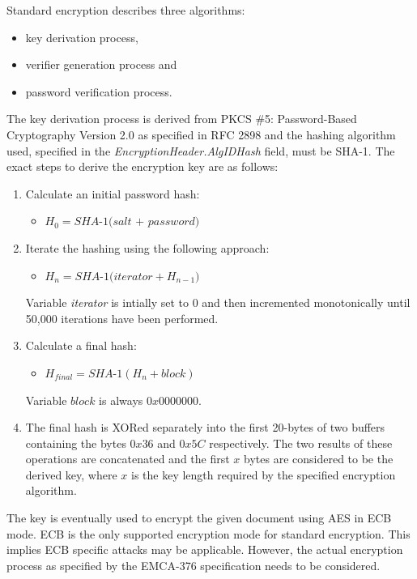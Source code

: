 \documentclass[11pt,oneside]{fithesis2}
\begin{document}
Standard encryption describes three algorithms:
\begin{itemize}
	\setlength\itemsep{0.1em}
	\item{key derivation process,}
	\item{verifier generation process and}
	\item{password verification process.}
\end{itemize}

The key derivation process is derived from PKCS \#5: Password-Based Cryptography Version 2.0 as specified in RFC 2898 \cite{rfc2898} and the hashing algorithm used, specified in the \textit{EncryptionHeader.AlgIDHash} field, must be SHA-1. The exact steps to derive the encryption key are as follows:

\begin{enumerate}
\item{Calculate an initial password hash:}
	\begin{itemize}
		\item{$H_0 =\textit{SHA-1(salt + password)}$}
	\end{itemize}
\item{Iterate the hashing using the following approach: 
	\begin{itemize}
		\item{$H_n = \textit{SHA-1(iterator} + H_{n-1})$}
	\end{itemize}
	Variable \textit{iterator} is intially set to 0 and then incremented monotonically until 50,000 iterations have been performed.}
\item{Calculate a final hash:
	\begin{itemize}
		\item{$H_{final} = \textit{SHA-1}(H_n + block)$}
	\end{itemize}
	Variable $block$ is always $0x0000000$.}
\item{The final hash is XORed separately into the first 20-bytes of two buffers containing the bytes $0x36$ and $0x5C$ respectively. The two results of these operations are concatenated and the first $x$ bytes are considered to be the derived key, where $x$ is the key length required by the specified encryption algorithm.}
\end{enumerate}

The key is eventually used to encrypt the given document using AES in ECB mode. ECB is the only supported encryption mode for standard encryption. This implies ECB specific attacks may be applicable. However, the actual encryption process as specified by the EMCA-376 specification needs to be considered. 
\end{document}
